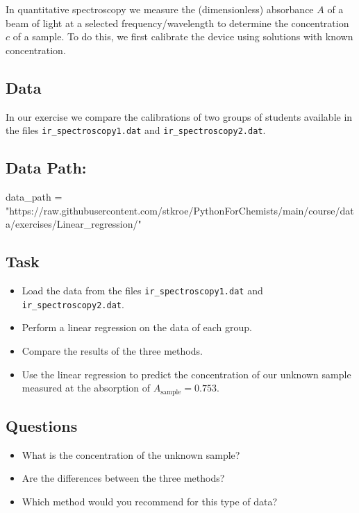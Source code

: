\documentclass[
  letterpaper,
  DIV=11,
  numbers=noendperiod]{scrreprt}
\newenvironment{Shaded}{\begin{snugshade}}{\end{snugshade}}
\newcommand{\NormalTok}[1]{\textcolor[rgb]{0.00,0.23,0.31}{#1}}
\newcommand{\OperatorTok}[1]{\textcolor[rgb]{0.37,0.37,0.37}{#1}}
\newcommand{\StringTok}[1]{\textcolor[rgb]{0.13,0.47,0.30}{#1}}
\providecommand{\tightlist}{%
  \setlength{\itemsep}{0pt}\setlength{\parskip}{0pt}}\usepackage{longtable,booktabs,array}
\begin{document}
In quantitative spectroscopy we measure the (dimensionless) absorbance
\(A\) of a beam of light at a selected frequency/wavelength to determine
the concentration \(c\) of a sample. To do this, we first calibrate the
device using solutions with known concentration.

\subsection{Data}\label{data-1}

In our exercise we compare the calibrations of two groups of students
available in the files \texttt{ir\_spectroscopy1.dat} and
\texttt{ir\_spectroscopy2.dat}.

\subsection{Data Path:}\label{data-path-1}

\begin{Shaded}
\begin{Highlighting}[]
\NormalTok{data\_path }\OperatorTok{=} \StringTok{"https://raw.githubusercontent.com/stkroe/PythonForChemists/main/course/data/exercises/Linear\_regression/"}
\end{Highlighting}
\end{Shaded}

\subsection{Task}\label{task-2}

\begin{itemize}
\tightlist
\item
  Load the data from the files \texttt{ir\_spectroscopy1.dat} and
  \texttt{ir\_spectroscopy2.dat}.
\item
  Perform a linear regression on the data of each group.
\item
  Compare the results of the three methods.
\item
  Use the linear regression to predict the concentration of our unknown
  sample measured at the absorption of \(A_\mathrm{sample} = 0.753\).
\end{itemize}

\subsection{Questions}\label{questions-3}

\begin{itemize}
\tightlist
\item
  What is the concentration of the unknown sample?
\item
  Are the differences between the three methods?
\item
  Which method would you recommend for this type of data?
\end{itemize}
\end{document}
